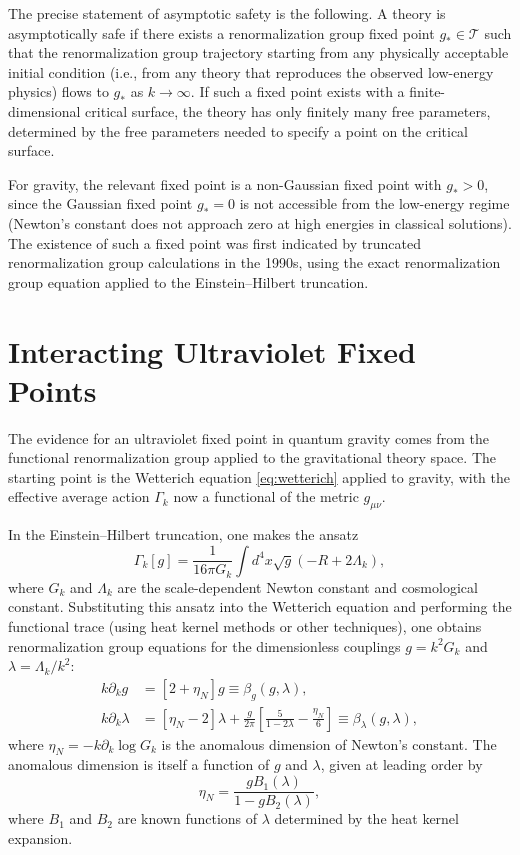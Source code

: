 \documentclass[11pt, twoside, openright]{book}
\theoremstyle{dotted}
\theoremstyle{definition}
\newcommand{\cT}{\mathcal{T}}          %
\newcommand{\Gk}{\Gamma_k}             %
\newcommand{\kdk}{k\partial_k}         %
\begin{document}
The precise statement of asymptotic safety is the following. A theory is
asymptotically safe if there exists a renormalization group fixed point $g_* \in \cT$
such that the renormalization group trajectory starting from any physically acceptable
initial condition (i.e., from any theory that reproduces the observed low-energy
physics) flows to $g_*$ as $k \to \infty$. If such a fixed point exists with a
finite-dimensional critical surface, the theory has only finitely many free
parameters, determined by the free parameters needed to specify a point on the
critical surface.

For gravity, the relevant fixed point is a non-Gaussian fixed point with $g_* > 0$,
since the Gaussian fixed point $g_* = 0$ is not accessible from the low-energy
regime (Newton's constant does not approach zero at high energies in classical
solutions). The existence of such a fixed point was first indicated by truncated
renormalization group calculations in the 1990s, using the exact renormalization
group equation applied to the Einstein--Hilbert truncation.

\section{Interacting Ultraviolet Fixed Points}

The evidence for an ultraviolet fixed point in quantum gravity comes from the
functional renormalization group applied to the gravitational theory space. The
starting point is the Wetterich equation \eqref{eq:wetterich} applied to gravity,
with the effective average action $\Gk$ now a functional of the metric $g_{\mu\nu}$.

In the Einstein--Hilbert truncation, one makes the ansatz
\begin{equation}
  \Gk[g] = \frac{1}{16\pi G_k}\int d^4x \sqrt{g}(-R + 2\Lambda_k),
  \label{eq:EH_ansatz}
\end{equation}
where $G_k$ and $\Lambda_k$ are the scale-dependent Newton constant and cosmological
constant. Substituting this ansatz into the Wetterich equation and performing the
functional trace (using heat kernel methods or other techniques), one obtains
renormalization group equations for the dimensionless couplings $g = k^2 G_k$ and
$\lambda = \Lambda_k/k^2$:
\begin{align}
  \kdk g &= [2 + \eta_N] g \equiv \beta_g(g, \lambda),
  \label{eq:grav_rge_g} \\
  \kdk \lambda &= [\eta_N - 2]\lambda + \frac{g}{2\pi}
  \left[\frac{5}{1-2\lambda} - \frac{\eta_N}{6}\right] \equiv \beta_\lambda(g, \lambda),
  \label{eq:grav_rge_lambda}
\end{align}
where $\eta_N = -\kdk\log G_k$ is the anomalous dimension of Newton's constant.
The anomalous dimension is itself a function of $g$ and $\lambda$, given at leading
order by
\begin{equation}
  \eta_N = \frac{g B_1(\lambda)}{1 - g B_2(\lambda)},
  \label{eq:eta_N}
\end{equation}
where $B_1$ and $B_2$ are known functions of $\lambda$ determined by the heat
kernel expansion.
\end{document}
